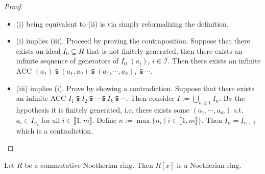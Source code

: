 \documentclass{article}
\begin{document}
\begin{proof}
    \begin{itemize}
        \item (i) being equivalent to (ii) is via simply reformalizing the definition.
        \item (i) implies (iii). Proceed by proving the contraposition. Suppose that there exists an ideal $I_0 \subseteq R$ that is not finitely generated, then there exists an infinite sequence of generators of $I_0$ $(a_i)$, $i\in \mathcal{I}$. Then there exists an infinite ACC $(a_1) \subsetneqq (a_1, a_2) \subsetneqq (a_1, \cdots, a_k), \subsetneqq\cdots$. 
        \item (iii) implies (i). Prove by showing a contradiction. Suppose that there exists an infinite ACC $I_1 \subsetneqq I_2 \subsetneqq \cdots \subsetneqq I_k \subsetneqq\cdots$. Then consider $I := \bigcup_{n\geq 1} I_n$. By the hypothesis it is finitely generated, i.e. there exists some $(a_1, \cdots, a_m)$ s.t. $a_i \in I_{n_i}$ for all $i\in \llbracket 1, m \rrbracket$. Define $n := \max\{ n_i \mid i\in \llbracket 1, m \rrbracket \}$. Then $I_n = I_{n+1}$ which is a contradiction.
    \end{itemize}
\end{proof}

\begin{theorem}
    Let $R$ be a commutative Noetherian ring. Then $R[x]$ is a Noetherian ring.
\end{theorem}
\end{document}
